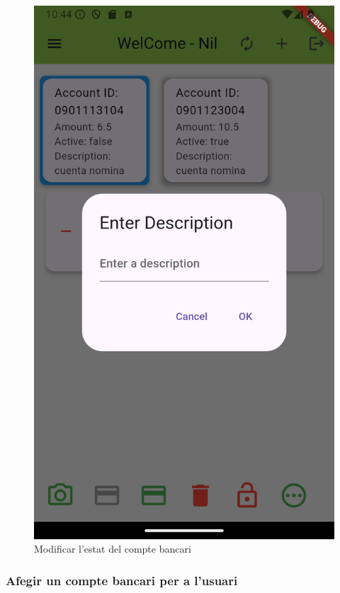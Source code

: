 \documentclass[a4paper,12pt,twoside]{ThesisStyle}
\begin{document}
\begin{figure}[h]
\begin{minipage}{0.30\textwidth}
        \includegraphics[width=\textwidth]{imatges/otherOperation3.png}
    \end{minipage}

    \caption{Modificar l'estat del compte bancari}
    \label{fig:Altres operacions sobre el compte bancari}
\end{figure}


\clearpage
\subsubsection{Afegir un compte bancari per a l'usuari}
\label{subsubsec:Afegir un compte bancari per a l'usuari}
\end{document}
